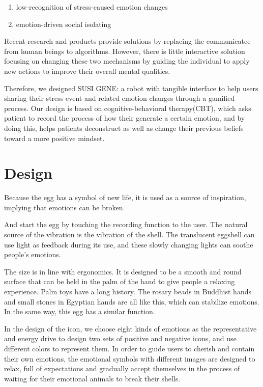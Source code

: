 \documentclass[manuscript,screen]{acmart}
\begin{document}
\begin{enumerate}
  \item low-recognition of stress-caused emotion changes
  \item emotion-driven social isolating
\end{enumerate} 

Recent research and products provide solutions by replacing the communicatee from human beings to algorithms. However, there is little interactive solution focusing on changing these two mechanisms by guiding the individual to apply new actions to improve their overall mental qualities.

Therefore, we designed SUSI GENE: a robot with tangible interface to help users sharing their stress event and related emotion changes through a gamified process. Our design is based on cognitive-behavioral therapy(CBT), which asks patient to record the process of how their generate a certain emotion, and by doing this, helps patients deconstruct as well as change their previous beliefs toward a more positive mindset.

\section{Design}

Because the egg has a symbol of new life, it is used as a source of inspiration, implying that emotions can be broken.

And start the egg by touching the recording function to the user. The natural source of the vibration is the vibration of the shell. The translucent eggshell can use light as feedback during its use, and these slowly changing lights can soothe people's emotions.

The size is in line with ergonomics. It is designed to be a smooth and round surface that can be held in the palm of the hand to give people a relaxing experience. Palm toys have a long history. The rosary beads in Buddhist hands and small stones in Egyptian hands are all like this, which can stabilize emotions. In the same way, this egg has a similar function.

In the design of the icon, we choose eight kinds of emotions as the representative and energy drive to design two sets of positive and negative icons, and use different colors to represent them. In order to guide users to cherish and contain their own emotions, the emotional symbols with different images are designed to relax, full of expectations and gradually accept themselves in the process of waiting for their emotional animals to break their shells.
\end{document}
